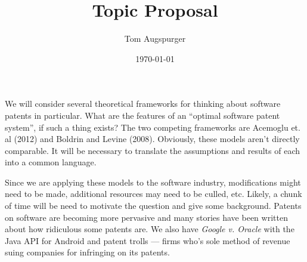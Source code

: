 \documentclass[11pt]{article}
\title{Topic Proposal}
\author{Tom Augspurger}
\date{\today}
\begin{document}
\maketitle

We will consider several theoretical frameworks for thinking about software patents in particular.  What are the features of an ``optimal software patent system'', if such a thing exists? The two competing frameworks are Acemoglu et. al (2012) and Boldrin and Levine (2008).  Obviously, these models aren't directly comparable. It will be necessary to translate the assumptions and results of each into a common language.  

Since we are applying these models to the software industry, modifications might need to be made, additional resources may need to be culled, etc.  Likely, a chunk of time will be need to motivate the question and give some background.  Patents on software are becoming more pervasive and many stories have been written about how ridiculous some patents are.  We also have \emph{Google v. Oracle} with the Java API for Android and patent trolls --- firms who's sole method of revenue suing companies for infringing on its patents.
\end{document}
